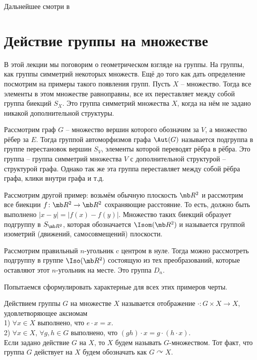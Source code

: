Дальнейшее смотри в \cite{}


\section{Действие группы на множестве}


В этой лекции мы поговорим о геометрическом взгляде на группы. На группы, как группы симметрий некоторых множеств. Ещё до того как дать определение посмотрим на примеры такого появления групп. Пусть $X$ -- множество. Тогда все элементы в этом множестве равноправны, все их переставляет между собой группа биекций $S_X$. Это группа симметрий множества $X$, когда на нём не задано никакой дополнительной структуры. 

Рассмотрим граф $G$ -- множество вершин которого обозначим за $V$, а множество рёбер за $E$. Тогда группой автоморфизмов графа  $\Aut(G)$ называется подгруппа в группе перестановок вершин $S_V$, элементы которой переводят рёбра в рёбра. Это группа -- группа симметрий множества $V$ с дополнительной структурой -- структурой графа. Однако так же эта группа переставляет между собой рёбра графа, клики внутри графа и т.д.

Рассмотрим другой пример: возьмём обычную плоскость $\mb R^2$ и рассмотрим все биекции $f\colon \mb R^2 \to \mb R^2$ сохраняющие расстояние. То есть, должно быть выполнено $|x-y|=|f(x)-f(y)|$. Множество таких биекций образует подгруппу в $S_{\mb R^2}$, которая обозначается $\Isom(\mb R^2)$ и называется группой изометрий (движений, самосовмещений) плоскости. 

Рассмотрим правильный $n$-угольник c  центром в нуле. Тогда можно рассмотреть подгруппу в группе $\Iso (\mb R^2)$ состоящую из тех преобразований, которые оставляют этот $n$-угольник на месте. Это группа $D_n$.

Попытаемся сформулировать характерные для всех этих примеров черты.


\dfn
Действием группы $G$ на множестве $X$ называется отображение $\cdot \colon G\times X\to X$, удовлетворяющее аксиомам\\
1) $\forall x \in X$  выполнено, что $e\cdot x=x$.\\
2) $\forall x \in X$, $\forall g,h\in G$ выполнено, что $(gh)\cdot x= g\cdot (h\cdot x)$.\\
Если задано действие $G$ на $X$, то $X$ будем называть $G$-множеством. Тот факт, что группа $G$ действует на $X$ будем обозначать как $G \curvearrowright X$. 
\edfn


